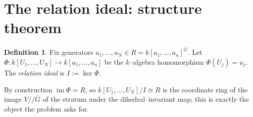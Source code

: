 \documentclass{amsart}
\theoremstyle{definition}
\newtheorem{definition}[theorem]{Definition}
\DeclareMathOperator{\im}{im}
\begin{document}
\section{The relation ideal: structure theorem}

\begin{definition}\label{def:I}
Fix generators $u_1,\dots,u_N\in R=k[a_1,\dots,a_n]^{\bar G}$. Let
$\Phi: k[U_1,\dots,U_N]\to k[a_1,\dots,a_n]$ be the $k$--algebra homomorphism
$\Phi(U_j)=u_j$. The \emph{relation ideal} is $I:=\ker\Phi$.
\end{definition}

By construction $\im\Phi=R$, so $k[U_1,\dots,U_N]/I\cong R$ is the coordinate ring
of the image $V/\!\!/\bar G$ of the stratum under the dihedral--invariant map; this
is exactly the object the problem asks for.
\end{document}
